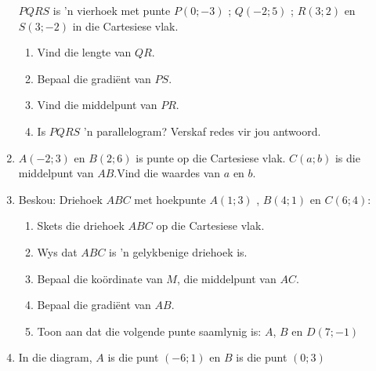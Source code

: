 \begin{eocexercises}{}
\begin{enumerate}[noitemsep, label=\textbf{\arabic*}. ]
$PQRS$ is ’n vierhoek met punte $P(0;-3)$ ; $Q(-2;5)$ ; $R(3;2)$ en $S(3;-2)$  in die Cartesiese vlak.
    \begin{enumerate}[noitemsep, label=\textbf{\alph*}. ] 
    \item Vind die lengte van $QR$.
    \item Bepaal die gradiënt van $PS$.
    \item Vind die middelpunt van $PR$.
    \item Is $PQRS$  ’n parallelogram? Verskaf redes vir jou antwoord.
    \end{enumerate}
\item $A(-2;3)$ en $B(2;6)$ is punte op die Cartesiese vlak. $C(a;b)$ is die middelpunt van $AB$.Vind die waardes
van $a$ en $b$.
\item 
Beskou: Driehoek $ABC$ met hoekpunte $A(1; 3)$ , $B(4;1)$ en $C (6; 4)$:
    \begin{enumerate}[noitemsep, label=\textbf{\alph*}. ] 
    \item Skets die driehoek $ABC$ op die Cartesiese vlak. 
    \item Wys dat $ABC$ is ’n gelykbenige driehoek is.
    \item Bepaal die koördinate van $M$, die middelpunt van $AC$.
    \item Bepaal die gradiënt van $AB$.
    \item Toon aan dat die volgende punte saamlynig is: $A$, $B$ en $D(7;-1)$
    \end{enumerate}
\item In die diagram, $A$ is die punt $(-6;1)$ en $B$ is die punt $(0;3)$
\setcounter{subfigure}{0}
\begin{figure}[H] %
\begin{center}
\end{center}

\end{figure}
\end{enumerate}
\end{eocexercises}
